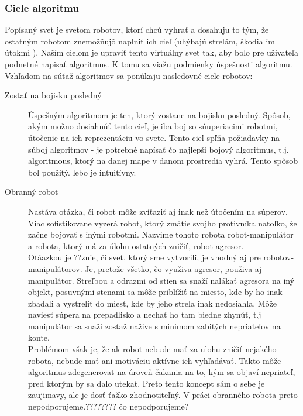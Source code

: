 \subsubsection{Ciele algoritmu}
Popísaný svet je svetom robotov, ktorí  chcú vyhrať a dosahuju to tým, že ostatným robotom znemožňujô naplniť ich cieľ (uhýbajú strelám, škodia im útokmi ). Naším cieľom je upraviť tento virtuálny svet tak, aby bolo pre uživateľa podnetné napisať algoritmus. K tomu sa viažu podmienky úspešnosti algoritmu. 
Vzhľadom na súťaž algoritmov sa ponúkaju nasledovné ciele robotov:
\begin{description}
\item [Zostať na bojisku posledný] \hfill \newline
Úspešným algoritmom je ten, ktorý zostane na bojisku posledný. Spôsob, akým možno dosiahnúť tento cieľ, je iba boj so súuperiacimi robotmi, útočenie na ich reprezentáciu vo svete. Tento cieľ spľňa požiadavky na súboj algoritmov - je potrebné napísať čo najlepši bojový algoritmus, t.j. algoritmous, ktorý na danej mape v danom prostredia vyhrá. Tento spôsob bol použitý. lebo je intuitívny.
\item [Obranný robot] \hfill \newline %
Nastáva otázka, či robot môže zvíťaziť aj inak než útočením na súperov. Viac sofistikovane vyzerá robot, ktorý zmätie svojho  protivníka natoľko, že začne bojovať s inými robotmi. Nazvime tohoto robota robot-manipulátor a robota, ktorý má za úlohu  ostatných zničiť, robot-agresor. \\
Otáazkou  je ??znie, či svet, ktorý sme vytvorili, je vhodný aj pre  robotov-manipulátorov. Je, pretože všetko, čo využiva agresor, použiva aj manipulátor. Streľbou a odrazmi od stien sa snaží nalákať agresora na iný objekt, posuvnými stenami sa môže priblížiť na miesto, kde by ho inak zbadali a vystreliť do miest, kde by jeho strela inak nedosiahla. Môže naviesť súpera na prepadlisko a nechať ho tam biedne zhynúť, t.j manipulátor sa snaži zostaž nažive s minimom zabitých nepriateľov na konte.\\ %
Problémom však je, že ak robot nebude mať za ulohu zničiť nejakého robota, nebude mať ani motiváciu aktívne ich vyhľadávať. Takto môže algoritmus zdegenerovat na úroveň čakania na to, kým sa objaví nepriateľ, pred ktorým by sa dalo utekat. Preto tento koncept sám o sebe je zaujimavy, ale je dosť ťažko zhodnotiteľný. V práci obranného robota preto nepodporujeme.???????? čo nepodporujeme?

\end{description}
